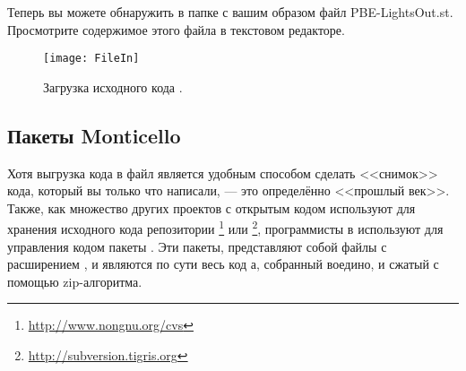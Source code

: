\documentclass[a4paper,10pt,twoside]{book}
\begin{document}
{%
Теперь вы можете обнаружить в папке с вашим образом файл PBE-LightsOut.st.
Просмотрите содержимое этого файла в текстовом редакторе.

\dothis{Откройте свежий образ \pharo и с помощью браузера файлов (File Browser) (пункт меню \menu{Tools \ldots {\go} File Browser}) загрузите (пункт меню \menu{file in}) файл PBE-LightsOut.st.

Проверьте, что игра продолжает работать и в новом образе.}

\begin{figure}[ht]
\centerline {\texttt{[image: FileIn]}}
\caption{Загрузка исходного кода \pharo.
}
\end{figure}

\subsection{Пакеты Monticello}
Хотя выгрузка кода в файл является удобным способом сделать <<снимок>> кода, который вы только что написали, --- это определённо <<прошлый век>>.
Также, как множество других проектов с открытым кодом используют для хранения исходного кода репозитории \footnote{\url{http://www.nongnu.org/cvs}} или \footnote{\url{http://subversion.tigris.org}},
программисты в \pharo используют для управления кодом пакеты .
Эти пакеты, представляют собой файлы с расширением , и являются по сути весь код а, собранный воедино, и сжатый с помощью zip-алгоритма.

}
\end{document}
